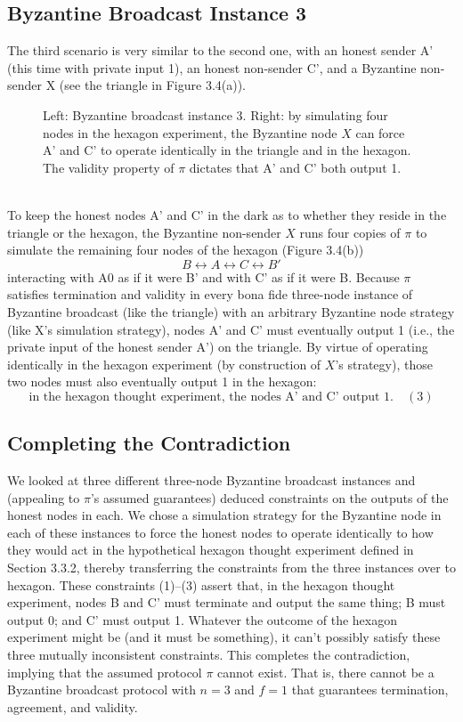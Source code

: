 \subsection{Byzantine Broadcast Instance 3}
The third scenario is very similar to the second one, with an honest sender A'
(this time with private input 1), an honest non-sender C', and a Byzantine non-sender X (see the triangle in Figure 3.4(a)).
\begin{figure}[h]
    \centering
    \qquad
    \caption{Left: Byzantine broadcast instance 3. Right: by simulating four nodes in the
    hexagon experiment, the Byzantine node $X$ can force A' and C' to operate identically in
    the triangle and in the hexagon. The validity property of $\pi$ dictates that A' and C' both
    output 1.}
    \label{fig:example}%
\end{figure}\\

To keep the honest nodes A' and C' in the dark as to whether they reside in the triangle
or the hexagon, the Byzantine non-sender $X$ runs four copies of $\pi$ to simulate the remaining
four nodes of the hexagon (Figure 3.4(b))
$$B \leftrightarrow A \leftrightarrow C \leftrightarrow B'$$
interacting with A0 as if it were B' and with C' as if it were B.
Because $\pi$ satisfies termination and validity in every bona fide three-node instance of
Byzantine broadcast (like the triangle) with an arbitrary Byzantine node strategy (like X’s
simulation strategy), nodes A' and C' must eventually output 1 (i.e., the private input of
the honest sender A') on the triangle. By virtue of operating identically in the hexagon
experiment (by construction of $X$’s strategy), those two nodes must also eventually output 1
in the hexagon:
$$\text{in the hexagon thought experiment, the nodes A' and C' output 1.} \quad (3)$$

\subsection{Completing the Contradiction}
We looked at three different three-node Byzantine broadcast instances and (appealing to
$\pi$’s assumed guarantees) deduced constraints on the outputs of the honest nodes in each.
We chose a simulation strategy for the Byzantine node in each of these instances to force
the honest nodes to operate identically to how they would act in the hypothetical hexagon
thought experiment defined in Section 3.3.2, thereby transferring the constraints from the three
instances over to hexagon. These constraints (1)–(3) assert that, in the hexagon thought
experiment, nodes B and C' must terminate and output the same thing; B must output 0;
and C' must output 1. Whatever the outcome of the hexagon experiment might be (and it
must be something), it can’t possibly satisfy these three mutually inconsistent constraints.
This completes the contradiction, implying that the assumed protocol $\pi$ cannot exist. That
is, there cannot be a Byzantine broadcast protocol with $n = 3$ and $f = 1$ that guarantees
termination, agreement, and validity.

